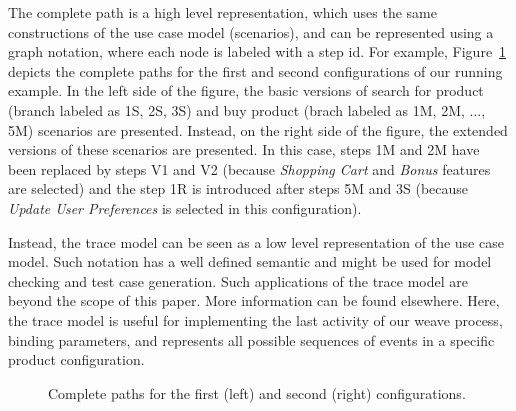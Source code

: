 \documentclass{llncs}
\begin{document}
\begin{enumerate}
The complete path is a high level representation, which uses the same constructions of the use case model (scenarios), and can be represented using a graph notation, where each node is labeled with a step id. For example, Figure~\ref{fig:complete-paths} depicts the complete paths for the first and second configurations of our running example. In the left side of the figure,  the basic versions of search for product (branch labeled as 1S, 2S, 3S) and buy product (brach labeled as 1M, 2M, ..., 5M) scenarios are presented. Instead, on the right side of the figure, the extended versions of these scenarios are presented. In this case, steps 1M and 2M have been replaced by steps V1 and V2 (because \emph{Shopping Cart} and \emph{Bonus} features are selected) and the step  1R is introduced after steps 5M and 3S (because \emph{Update User Preferences} is selected in this configuration).
 
Instead, the trace model can be seen as a low level representation of the use case model. Such notation has a well defined semantic and might 
be used for model checking and test case generation. Such applications of the trace model are beyond the scope of this paper. More information 
can be found elsewhere\cite{csp-hoare,csp-roscoe,cfeitosa-sbmf-2006}. Here, the trace model is useful for implementing the last activity of our weave process, binding parameters, and 
represents all possible sequences of events in a specific product configuration. 


 
\begin{figure}[t]
\begin{center}
\begin{tiny}
\begin{xy}
\end{xy}
\end{tiny}
\caption{Complete paths for the first (left) and second (right) configurations.}
\label{fig:complete-paths}
\end{center}
\end{figure}


\end{enumerate}
\end{document}
